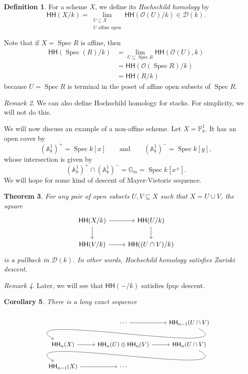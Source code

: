 \documentclass[10pt, oneside]{memoir}
\newtheorem{thm}{Theorem}[subsection]
\newtheorem{cor}[thm]{Corollary}
\theoremstyle{definition}
\newtheorem{defn}[thm]{Definition}
\theoremstyle{remark}
\newtheorem{rmk}[thm]{Remark}
\theoremstyle{plain}
\theoremstyle{definition}
\theoremstyle{remark}
\newcommand{\A}{\mathbb{A}}
\newcommand{\G}{\mathbb{G}}
\renewcommand{\P}{\mathbb{P}}
\newcommand{\mc}[1]{\mathcal{#1}}
\newcommand{\ms}[1]{\mathsf{#1}}
\newcommand{\1}{\mathbf{1}}
\newcommand{\2}{\mathbf{2}}
\newcommand{\3}{\mathbf{3}}
\newcommand{\HH}{\ms{HH}}
\DeclareMathOperator{\Spec}{Spec}
\begin{document}
\begin{defn}
    For a scheme \(X \), we define its \textit{Hochschild homology} by
    \[ \HH(X/k) = \lim_{\substack{U \subseteq X \\ U \text{ affine open}}} \HH(\mc{O}(U)/k) \in \mc{D}(k). \]
\end{defn}

Note that if \(X = \Spec R \) is affine, then
\begin{align*}
    \HH(\Spec(R)/k) &= \lim_{U \subseteq \Spec R} \HH(\mc{O}(U), k) \\
    &= \HH(\mc{O}(\Spec R)/k) \\
    &= \HH(R/k)
\end{align*}
because \(U = \Spec R \) is terminal in the poset of affine open subsets of \(\Spec R \).

\begin{rmk}
    We can also define Hochschild homology for stacks. For simplicity, we will not do this.
\end{rmk}


We will now discuss an example of a non-affine scheme. Let \(X = \P^1_k \). It has an open cover by
\[ (\A^1_k)^+ = \Spec k[x] \qquad \text{and} \qquad (\A_k^1)^- = \Spec k[y], \]
whose intersection is given by
\[ (\A_k^1)^+ \cap (\A_k^1)^- = \G_m = \Spec k[x^{\pm}]. \]
We will hope for some kind of descent of Mayer-Vietoric sequence.

\begin{thm}\label{thm:zariskidescent}
    For any pair of open subsets \(U, V \subseteq X \) such that \(X = U \cup V \), the square
    \begin{equation*}
    \begin{tikzcd}
        \HH(X/k) \ar{r} \ar{d} & \HH(U/k) \ar{d} \\
        \HH(V/k) \ar{r} & \HH((U \cap V)/k)
    \end{tikzcd}
    \end{equation*}
    is a pullback in \(\mc{D}(k) \). In other words, Hochschild homology satisfies Zariski descent.
\end{thm}

\begin{rmk}
    Later, we will see that \(\HH(-/k) \) satisfies fpqc descent.
\end{rmk}

\begin{cor}
    There is a long exact sequence
    \begin{equation*}
        \begin{tikzcd}
            & \cdots \ar{r} & \HH_{n-1}(U \cap V) \arrow[out=-30, in=150]{dll} \\
            \HH_{n}(X) \ar{r} & \HH_n(U) \oplus \HH_n(V) \ar{r} & \HH_n(U \cap V) \arrow[out=-30,in=150]{dll} \\
            \HH_{n-1}(X) \ar{r} & \cdots
        \end{tikzcd}
    \end{equation*}
\end{cor}
\end{document}
